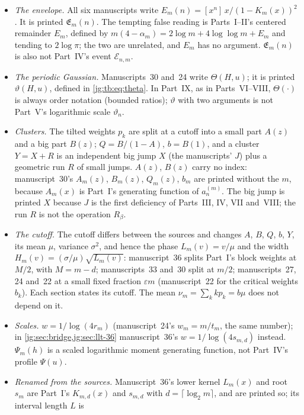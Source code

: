 \documentclass[11pt,a4paper]{article}
\theoremstyle{definition}\newaliascnt{definition}{theorem}
\theoremstyle{remark}\newaliascnt{remark}{theorem}
\begin{document}
\begin{itemize}
\item \emph{The envelope.} All six manuscripts write
 $E_m(n)=[x^n]\,x/(1-K_m(x))^2$. It is printed $\mathfrak E_m(n)$. The
 tempting false reading is Parts~I--II's centered remainder $E_m$, defined by
 $m(4-\alpha_m)=2\log m+4\log\log m+E_m$ and tending to $2\log\pi$; the two
 are unrelated, and $E_m$ has no argument. $\mathfrak E_m(n)$ is also not
 Part~IV's event $\mathcal E_{n,m}$.
\item \emph{The periodic Gaussian.} Manuscripts~30 and~24 write $\Theta(H,u)$;
 it is printed $\vartheta(H,u)$, defined in \eqref{jg:tb:eq:theta}. In
 Part~IX, as in Parts~VI--VIII, $\Theta(\cdot)$ is always order notation
 (bounded ratios); $\vartheta$ with two arguments is not Part~V's logarithmic
 scale $\vartheta_n$.
\item \emph{Clusters.} The tilted weights $p_k$ are split at a cutoff into a
 small part $A(z)$ and a big part $B(z)$; $Q=B/(1-A)$, $b=B(1)$, and a cluster
 $Y=X+R$ is an independent big jump $X$ (the manuscripts' $J$) plus a
 geometric run $R$ of small jumps. $A(z)$, $B(z)$ carry no index: manuscript~30's
 $A_m(z)$, $B_m(z)$, $Q_m(z)$, $b_m$ are printed without the $m$, because
 $A_m(x)$ is Part~I's generating function of $a_n^{(m)}$. The big jump is
 printed $X$ because $J$ is the first deficiency of Parts~III, IV, VII
 and~VIII; the run $R$ is not the operation $R_\beta$.
\item \emph{The cutoff.} The cutoff differs between the sources and changes
 $A$, $B$, $Q$, $b$, $Y$, its mean $\mu$, variance $\sigma^2$, and hence the
 phase $L_m(v)=v/\mu$ and the width $H_m(v)=(\sigma/\mu)\sqrt{L_m(v)}$:
 manuscript~36 splits Part~I's block weights at $M/2$, with $M=m-d$;
 manuscripts~33 and~30 split at $m/2$; manuscripts~27, 24 and~22 at a small
 fixed fraction $\varepsilon m$ (manuscript~22 for the critical weights
 $b_k$). Each section states its cutoff. The mean $\nu_m=\sum_kkp_k=b\mu$ does
 not depend on it.
\item \emph{Scales.} $w=1/\log(4r_m)$ (manuscript~24's $w_m=m/t_m$, the same
 number); in \cref{jg:sec:bridge,jg:sec:llt-36} manuscript~36's
 $w=1/\log(4s_{m,d})$ instead. $\Psi_m(h)$ is a scaled logarithmic
 moment generating function, not Part~IV's profile $\Psi(u)$.
\item \emph{Renamed from the sources.} Manuscript~36's lower kernel $L_m(x)$
 and root $s_m$ are Part~I's $K_{m,d}(x)$ and $s_{m,d}$ with
 $d=\lceil\log_2m\rceil$, and are printed so; its interval length $L$ is

\end{itemize}
\end{document}
